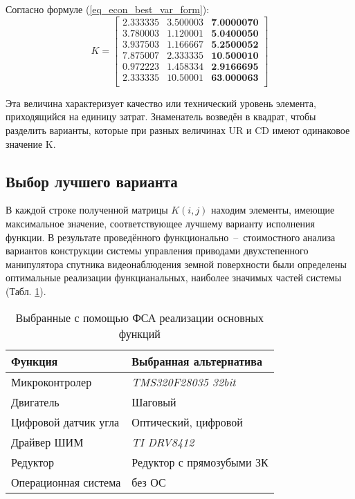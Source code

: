 Согласно формуле (\ref{eq_econ_best_var_form}):
\begin{equation}
    K =
        \begin{bmatrix}
            2.333335 & 3.500003 & \textbf{7.0000070} \\
            3.780003 & 1.120001 & \textbf{5.0400050} \\
            3.937503 & 1.166667 & \textbf{5.2500052} \\
            7.875007 & 2.333335 & \textbf{10.500010} \\
            0.972223 & 1.458334 & \textbf{2.9166695} \\
            2.333335 & 10.50001 & \textbf{63.000063} \\
        \end{bmatrix}
    \label{eq_econ_best_var}
\end{equation}

Эта величина характеризует качество или технический уровень
элемента, приходящийся на единицу затрат. Знаменатель возведён в квадрат,
чтобы разделить варианты, которые при разных величинах UR и CD имеют
одинаковое значение K.

\newpage
\subsection{Выбор лучшего варианта}
В каждой строке полученной матрицы $K(i, j)$ находим элементы,
имеющие максимальное значение, соответствующее лучшему варианту
исполнения функции.
В результате проведённого функционально~--~стоимостного анализа
вариантов конструкции системы управления приводами двухстепенного манипулятора
спутника видеонаблюдения земной поверхности были определены оптимальные
реализации функцианальных, наиболее значимых частей системы
(Табл. \ref{tbl_econ_result}).

\begin{table}[ht!]
    \centering
    \begin{tabular}{|l|l|}
        \hline
        Функция & Выбранная альтернатива \\
        \hline
        \hline
        Микроконтролер & \textit{TMS320F28035 32bit} \\
        \hline
        Двигатель & Шаговый \\
        \hline
        Цифровой датчик угла & Оптический, цифровой \\
        \hline
        Драйвер ШИМ & \textit{TI DRV8412} \\
        \hline
        Редуктор & Редуктор с прямозубыми ЗК \\
        \hline
        Операционная система & без ОС \\
        \hline
    \end{tabular}
    \caption{Выбранные с помощью ФСА реализации основных функций}
    \label{tbl_econ_result}
\end{table}

